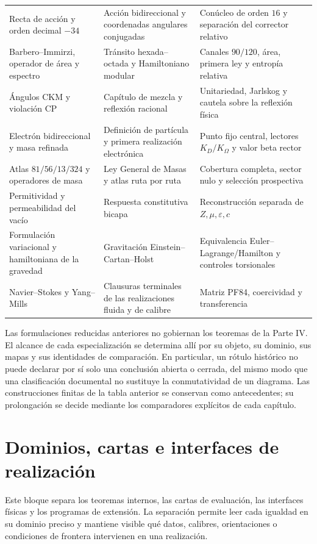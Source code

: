 \begin{longtable}{@{}>{\raggedright\arraybackslash}p{}
  >{\raggedright\arraybackslash}p{}
  >{\raggedright\arraybackslash}p{}@{}}
Recta de acción y orden decimal \(-34\)
& Acción bidireccional y coordenadas angulares conjugadas
& Conúcleo de orden $16$ y separación del corrector relativo\\
Barbero--Immirzi, operador de área y espectro
& Tránsito hexada--octada y Hamiltoniano modular
& Canales $90/120$, área, primera ley y entropía relativa\\
Ángulos CKM y violación CP
& Capítulo de mezcla y reflexión racional
& Unitariedad, Jarlskog y cautela sobre la reflexión física\\
Electrón bidireccional y masa refinada
& Definición de partícula y primera realización electrónica
& Punto fijo central, lectores $K_D/K_\Omega$ y valor beta rector\\
Atlas \(81/56/13/324\) y operadores de masa
& Ley General de Masas y atlas ruta por ruta
& Cobertura completa, sector nulo y selección prospectiva\\
Permitividad y permeabilidad del vacío
& Respuesta constitutiva bicapa
& Reconstrucción separada de \(Z,\mu,\varepsilon,c\)\\
Formulación variacional y hamiltoniana de la gravedad
& Gravitación Einstein--Cartan--Holst
& Equivalencia Euler--Lagrange/Hamilton y controles torsionales\\
Navier--Stokes y Yang--Mills
& Clausuras terminales de las realizaciones fluida y de calibre
& Matriz PF84, coercividad y transferencia\\
\bottomrule
\end{longtable}
\endgroup

Las formulaciones reducidas anteriores no gobiernan los teoremas de la
Parte IV. El alcance de cada especialización se determina allí por su objeto,
su dominio, sus mapas y sus identidades de comparación. En particular, un
rótulo histórico no puede declarar por sí solo una conclusión abierta o
cerrada, del mismo modo que una clasificación documental no sustituye la
conmutatividad de un diagrama. Las construcciones finitas de la tabla anterior
se conservan como antecedentes; su prolongación se decide mediante los
comparadores explícitos de cada capítulo.

\chapter{Dominios, cartas e interfaces de realización}
\label{app:dominios-cartas-interfaces-acumulativo}

Este bloque separa los teoremas internos, las cartas de evaluación, las
interfaces físicas y los programas de extensión. La separación permite leer
cada igualdad en su dominio preciso y mantiene visible qué datos, calibres,
orientaciones o condiciones de frontera intervienen en una realización.

